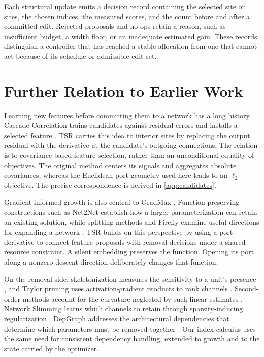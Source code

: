 \documentclass[10pt]{article}
\theoremstyle{paper}
\begin{document}
Each structural update emits a decision record containing the selected site or sites, the chosen indices, the measured scores, and the count before and after a committed edit. Rejected proposals and no-ops retain a reason, such as insufficient budget, a width floor, or an inadequate estimated gain. These records distinguish a controller that has reached a stable allocation from one that cannot act because of its schedule or admissible edit set.

\section{Further Relation to Earlier Work}
\label{app:related}
Learning new features before committing them to a network has a long history. Cascade-Correlation trains candidates against residual errors and installs a selected feature \citep{fahlman1989cascade}. TSR carries this idea to interior sites by replacing the output residual with the derivative at the candidate's outgoing connections. The relation is to covariance-based feature selection, rather than an unconditional equality of objectives. The original method centers its signals and aggregates absolute covariances, whereas the Euclidean port geometry used here leads to an $\ell_2$ objective. The precise correspondence is derived in \cref{app:candidates}.

Gradient-informed growth is also central to GradMax \citep{evci2022gradmax}. Function-preserving constructions such as Net2Net \citep{Chen2016} establish how a larger parameterization can retain an existing solution, while splitting methods and Firefly examine useful directions for expanding a network \citep{wu2019splitting,wu2020firefly}. TSR builds on this perspective by using a port derivative to connect feature proposals with removal decisions under a shared resource constraint. A silent embedding preserves the function. Opening its port along a nonzero descent direction deliberately changes that function.

On the removal side, skeletonization measures the sensitivity to a unit's presence \citep{mozer1988skeletonization}, and Taylor pruning uses activation-gradient products to rank channels \citep{molchanov2017pruning}. Second-order methods account for the curvature neglected by such linear estimates \citep{lecun1989optimal,hassibi1992second}. Network Slimming learns which channels to retain through sparsity-inducing regularization \citep{liu2017learning}. DepGraph addresses the architectural dependencies that determine which parameters must be removed together \citep{10204583}. Our index calculus uses the same need for consistent dependency handling, extended to growth and to the state carried by the optimizer.
\end{document}
